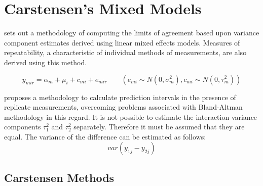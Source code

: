 \documentclass[12pt, a4paper]{report}
\theoremstyle{plain}
\theoremstyle{definition}
\theoremstyle{remark}
\begin{document}
	
	
	\section{Carstensen's Mixed Models}
	
	
	
	\citet{BXC2008} sets out a methodology of computing the limits of
	agreement based upon variance component estimates derived using
	linear mixed effects models. Measures of repeatability, a
	characteristic of individual methods of measurements, are also
	derived using this method.
	
	
	\begin{equation}
	y_{mir}  = \alpha_{m} + \mu_{i} + c_{mi} + e_{mir} \qquad ( e_{mi}
	\sim N(0,\sigma^{2}_{m}), c_{mi} \sim N(0,\tau^{2}_{m}))
	\end{equation}
	
	\citet{BXC2008} proposes a methodology to calculate prediction
	intervals in the presence of replicate measurements, overcoming
	problems associated with Bland-Altman methodology in this regard.
	It is not possible to estimate the interaction variance components
	$\tau^{2}_{1}$ and $\tau^{2}_{2}$ separately. Therefore it must be
	assumed that they are equal. The variance of the difference can be
	estimated as follows:
	\begin{equation}
	var(y_{1j}-y_{2j})
	\end{equation}
	
	
	
	
	
	\subsection{Carstensen Methods}
	
\end{document}
